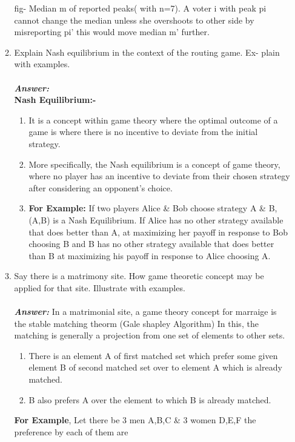 \documentclass[12pt]{article}
\begin{document}
\begin{enumerate}
\begin{enumerate}
fig- Median m of reported peaks( with n=7). A voter i with peak pi cannot change the median unless she overshoots to other side by misreporting pi' this would move median m' further.\\
\item Explain Nash equilibrium in the context of the routing game. Ex-
plain with examples.\\\\
\textbf{\emph{Answer: }}\\ \textbf{Nash Equilibrium:-}
\begin{enumerate}
\item It is a concept within game theory where the optimal outcome of a game is where there is no incentive to deviate from the initial strategy.
\item More specifically, the Nash equilibrium is a concept of game theory, where no player has an incentive to deviate from their chosen strategy after considering an opponent's choice.
\item \textbf{For Example:} If two players Alice \& Bob choose strategy A \& B, (A,B) is a Nash Equilibrium. If Alice has no other strategy available that does better than A, at maximizing her payoff in response to Bob choosing B and B has no other strategy available that does better than B at maximizing his payoff in response to Alice choosing A.
\end{enumerate}
\item Say there is a matrimony site. How game theoretic concept may
be applied for that site. Illustrate with examples.\\\\
\textbf{\emph{Answer: }} In a matrimonial site, a game theory concept for marraige is the stable matching theorm (Gale shapley Algorithm)
In this, the matching is generally a projection from one set of elements to other sets.
\begin{enumerate}
\item There is an element A of first matched set which prefer some given element B of second matched set over to element A which is already matched.
\item B also prefers A over the element to which B is already matched.
\end{enumerate}
\textbf{For Example}, Let there be 3 men A,B,C \& 3 women D,E,F the preference by each of them are\\
\begin{center}
\begin{tabular}{ |c|c c c| } 

\end{tabular}
\end{center}
\end{enumerate}
\end{enumerate}
\end{document}
